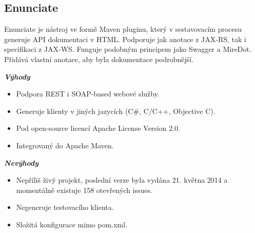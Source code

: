\subsection{Enunciate}

Enunciate je nástroj ve formě Maven pluginu, který v sestavovacím procesu
generuje API dokumentaci v HTML. Podporuje jak anotace z JAX-RS, tak i specifikaci z JAX-WS.
Funguje podobným principem jako Swagger a MireDot. Přidává vlastní anotace, aby byla
dokumentace podrobnější.

\textbf{\textit{Výhody}}

\begin{itemize}
  \item Podpora REST i SOAP-based webové služby.
  \item Generuje klienty v jiných jazycích (C\#, C/C++, Objective C).
  \item Pod open-source licencí Apache License Version 2.0.
  \item Integrovaný do Apache Maven.
\end{itemize}

\textbf{\textit{Nevýhody}}

\begin{itemize}
  \item Nepříliš živý projekt, poslední verze byla vydána 21. května 2014 a momentálně
existuje 158 otevřených issues.
  \item Negeneruje testovacího klienta.
  \item Složitá konfigurace mimo pom.xml.
\end{itemize}
